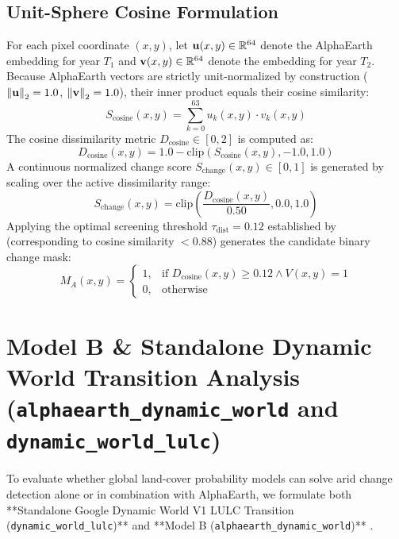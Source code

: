 \subsection{Unit-Sphere Cosine Formulation}
For each pixel coordinate $(x, y)$, let $\mathbf{u}(x, y) \in \mathbb{R}^{64}$ denote the AlphaEarth embedding for year $T_1$ and $\mathbf{v}(x, y) \in \mathbb{R}^{64}$ denote the embedding for year $T_2$. Because AlphaEarth vectors are strictly unit-normalized by construction ($\left\lVert\mathbf{u}\right\rVert_2 = 1.0$, $\left\lVert\mathbf{v}\right\rVert_2 = 1.0$), their inner product equals their cosine similarity:
\begin{equation}
    S_{\text{cosine}}(x, y) = \sum_{k=0}^{63} u_k(x, y) \cdot v_k(x, y)
    \label{eq:dot_prod_cosine}
\end{equation}
The cosine dissimilarity metric $D_{\text{cosine}} \in [0, 2]$ is computed as:
\begin{equation}
    D_{\text{cosine}}(x, y) = 1.0 - \text{clip}\left( S_{\text{cosine}}(x, y), -1.0, 1.0 \right)
    \label{eq:cosine_dist_eval}
\end{equation}
A continuous normalized change score $S_{\text{change}}(x, y) \in [0, 1]$ is generated by scaling over the active dissimilarity range:
\begin{equation}
    S_{\text{change}}(x, y) = \text{clip}\left( \frac{D_{\text{cosine}}(x, y)}{0.50}, 0.0, 1.0 \right)
    \label{eq:scaled_change_score}
\end{equation}
Applying the optimal screening threshold $\tau_{\text{dist}} = 0.12$ established by \citet{manikandan2026alphaearth} (corresponding to cosine similarity $< 0.88$) generates the candidate binary change mask:
\begin{equation}
    M_A(x, y) = \begin{cases} 
        1, & \text{if } D_{\text{cosine}}(x, y) \ge 0.12 \land V(x, y) = 1 \\ 
        0, & \text{otherwise} 
    \end{cases}
    \label{eq:mask_model_a}
\end{equation}

\section{Model B \& Standalone Dynamic World Transition Analysis (\texttt{alphaearth\_dynamic\_world} and \texttt{dynamic\_world\_lulc})}
\label{sec:ai_model_b}
To evaluate whether global land-cover probability models can solve arid change detection alone or in combination with AlphaEarth, we formulate both **Standalone Google Dynamic World V1 LULC Transition (\texttt{dynamic\_world\_lulc})** and **Model B (\texttt{alphaearth\_dynamic\_world})** \citep{brown2022dynamicworld}.

